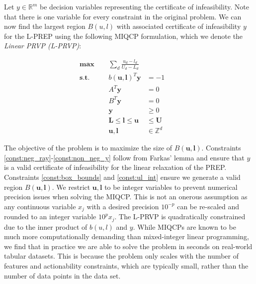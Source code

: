 Let $y \in \mathbb{R}^{m}$ be decision variables representing the certificate of infeasibility.  Note that there is one variable for every constraint in the original problem. We can now find the largest region $B(u, l)$ with associated certificate of infeasibility $y$ for the L-PREP using the following MIQCP formulation, which we denote the \emph{Linear PRVP (L-PRVP)}:

\begin{align}
	\textbf{max}~~&& \sum_d \frac{u_d - l_d}{U_d - L_d} \label{obj:size}\\[.1cm]
	\textbf{s.t.}~~&& b(\mathbf{u}, \mathbf{l})^T \mathbf{y} &= -1 ~~&& \label{const:neg_ray}\\
	&& A^T \mathbf{y} &= 0 && \label{const:dual_feas_a} \\
	&& B^T \mathbf{y} &= 0 && \label{const:dual_feas_b} \\
	&& \mathbf{y} &\geq 0 && \label{const:non_neg_y} \\
	&& \mathbf{L} \leq \mathbf{l} \leq \mathbf{u} &\leq \mathbf{U} && \label{const:box_bounds} \\
	&& \mathbf{u}, \mathbf{l} &\in \mathbb{Z}^d \label{const:ul_int}
\end{align}

The objective of the problem is to maximize the size of $B(\mathbf{u}, \mathbf{l})$. Constraints \eqref{const:neg_ray}-\eqref{const:non_neg_y} follow from Farkas' lemma and ensure that $y$ is a valid certificate of infeasibility for the linear relaxation of the PREP. Constraints \eqref{const:box_bounds} and \eqref{const:ul_int} ensure we generate a valid region $B(\mathbf{u}, \mathbf{l})$. We restrict $\mathbf{u}, \mathbf{l}$ to be integer variables to prevent numerical precision issues when solving the MIQCP. This is not an onerous assumption as any continuous variable $x_j$ with a desired precision $10^{-p}$ can be re-scaled and rounded to an integer variable $10^p x_j$. The L-PRVP is quadratically constrained due to the inner product of $b(u,l)$ and $y$. While MIQCPs are known to be much more computationally demanding than mixed-integer linear programming, we find that in practice we are able to solve the problem in seconds on real-world tabular datasets. This is because the problem only scales with the number of features and actionability constraints, which are typically small, rather than the number of data points in the data set. %


